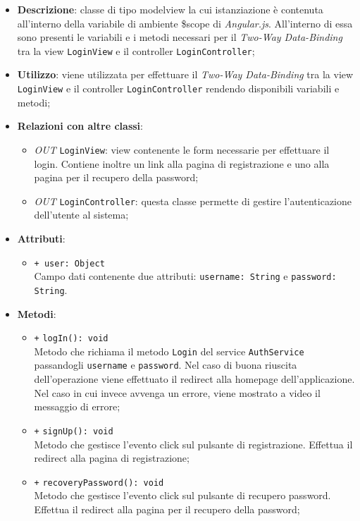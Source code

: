 	\begin{itemize}
		\item \textbf{Descrizione}: classe di tipo modelview la cui istanziazione è contenuta all'interno della variabile di ambiente \$scope di \textit{Angular.js}. All'interno di essa sono presenti le variabili e i metodi necessari per il \textit{Two-Way Data-Binding} tra la view \texttt{LoginView} e il controller \texttt{LoginController};
		\item \textbf{Utilizzo}: viene utilizzata per effettuare il \textit{Two-Way Data-Binding} tra la view \texttt{LoginView} e il controller \texttt{LoginController} rendendo disponibili variabili e metodi;
		\item \textbf{Relazioni con altre classi}: 
		\begin{itemize}
			\item \textit{OUT} \texttt{LoginView}: view contenente le form necessarie per effettuare il login. Contiene inoltre un link alla pagina di registrazione e uno alla pagina per il recupero della password; 
			\item \textit{OUT} \texttt{LoginController}: questa classe permette di gestire l'autenticazione dell'utente al sistema;
		\end{itemize}
		\item \textbf{Attributi}: 
		\begin{itemize}
				\item \texttt{+ user: Object} \\ Campo dati contenente due attributi: \texttt{username: String} e \texttt{password: String}.
		\end{itemize}
		\item \textbf{Metodi}: 
		\begin{itemize}
			\item \texttt{+} \texttt{logIn(): void} \\
			Metodo che richiama il metodo \texttt{Login} del service \texttt{AuthService} passandogli \texttt{username} e \texttt{password}. Nel caso di buona riuscita dell'operazione viene effettuato il redirect alla homepage dell'applicazione. Nel caso in cui invece avvenga un errore, viene mostrato a video il messaggio di errore;
			\item \texttt{+} \texttt{signUp(): void} \\
			Metodo che gestisce l’evento click sul pulsante di registrazione. Effettua il redirect alla pagina di registrazione;
			\item \texttt{+} \texttt{recoveryPassword(): void} \\
			Metodo che gestisce l’evento click sul pulsante di recupero password. Effettua il redirect alla pagina per il recupero della password; 
		\end{itemize}
	\end{itemize}
	
	